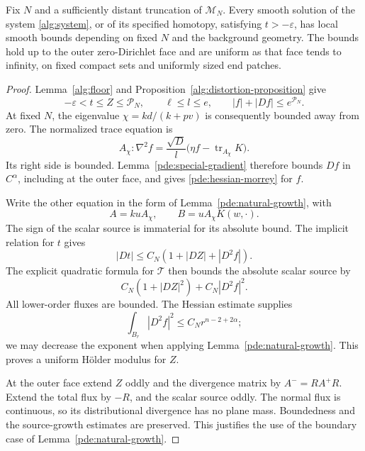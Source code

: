 \begin{lemma}
\label{pde:coupled-estimates}
Fix \(N\) and a sufficiently distant truncation of \(\mathcal M_N\).
Every smooth solution of the system \eqref{alg:system}, or of its
specified homotopy, satisfying \(t>-\varepsilon\), has local smooth
bounds depending on fixed \(N\) and the background geometry.
The bounds hold up to the outer zero-Dirichlet face and are uniform
as that face tends to infinity, on fixed compact sets and uniformly
sized end patches.
\end{lemma}

\begin{proof}
Lemma~\ref{alg:floor} and Proposition~\ref{alg:distortion-proposition} give
\[
 -\varepsilon<t\le Z\le\mathcal P_N,\qquad
 \ell\le l\le e,\qquad |f|+|Df|\le e^{\mathcal P_N}.
\]
At fixed \(N\), the eigenvalue
\(\chi=kd/(k+pv)\) is consequently bounded away from zero.
The normalized trace equation is
\begin{equation}
 A_\chi:\nabla^2f
 =\frac{\sqrt D}{l}
       \big(\eta f-\operatorname{tr}_{A_\chi}K\big).
 \label{pde:normalized-trace}
\end{equation}
Its right side is bounded.  Lemma~\ref{pde:special-gradient}
therefore bounds \(Df\) in \(C^\alpha\), including at the outer face,
and gives \eqref{pde:hessian-morrey} for \(f\).

Write the other equation in the form of
Lemma~\ref{pde:natural-growth}, with
\[
 A=kuA_\chi,\qquad B=uA_\chi K(w,\cdot).
\]
The sign of the scalar source is immaterial for its absolute bound.
The implicit relation for \(t\) gives
\[
 |Dt|\le C_N(1+|DZ|+|D^2f|).
\]
The explicit quadratic formula for \(\mathcal T\) then bounds the
absolute scalar source by
\[
 C_N(1+|DZ|^2)+C_N|D^2f|^2.
\]
All lower-order fluxes are bounded.  The Hessian estimate supplies
\[
 \int_{B_r}|D^2f|^2\le C_Nr^{n-2+2\alpha};
\]
we may decrease the exponent when applying
Lemma~\ref{pde:natural-growth}.  This proves a uniform H\"older modulus
for \(Z\).

At the outer face extend \(Z\) oddly and the divergence matrix by
\(A^-=RA^+R\).  Extend the total flux by \(-R\), and the scalar
source oddly.  The normal flux is continuous, so its distributional
divergence has no plane mass.  Boundedness and the source-growth
estimates are preserved.  This justifies the use of the boundary
case of Lemma~\ref{pde:natural-growth}.


\end{proof}
